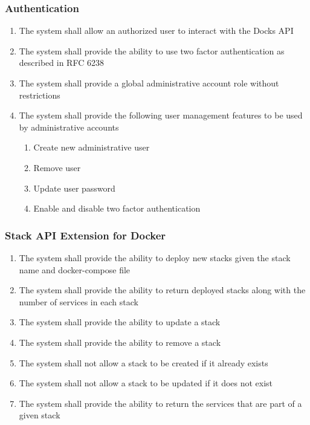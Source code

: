 \documentclass[]{article}
\begin{document}
\subsubsection{Authentication}
\begin{enumerate}[label*=R2.\arabic*.]
	\item The system shall allow an authorized user to interact with the Docks API
	\item The system shall provide the ability to use two factor authentication as described in RFC 6238
	\item The system shall provide a global administrative account role without restrictions
	\item The system shall provide the following user management features to be used by administrative accounts
	\begin{enumerate}[label*=\arabic*.]
		\item Create new administrative user
		\item Remove user
		\item Update user password
		\item Enable and disable two factor authentication
	\end{enumerate}
\end{enumerate}

\subsubsection{Stack API Extension for Docker}
\begin{enumerate}[label*=R3.\arabic*.]
	\item The system shall provide the ability to deploy new stacks given the stack name and docker-compose file
	\item The system shall provide the ability to return deployed stacks along with the number of services in each stack
	\item The system shall provide the ability to update a stack
	\item The system shall provide the ability to remove a stack
	\item The system shall not allow a stack to be created if it already exists
	\item The system shall not allow a stack to be updated if it does not exist
	\item The system shall provide the ability to return the services that are part of a given stack
\end{enumerate}
\end{document}
